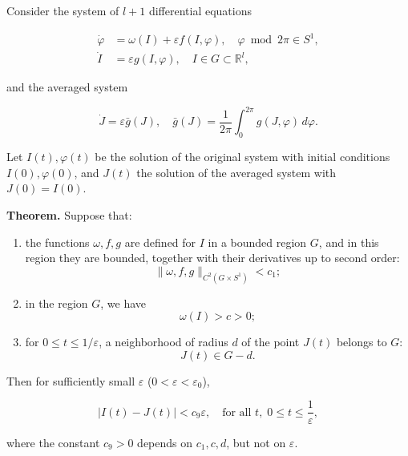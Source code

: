 Consider the system of $l + 1$ differential equations

$$\begin{aligned}
\dot{\varphi} &= \omega(I) + \varepsilon f(I, \varphi), \quad \varphi \bmod 2\pi \in S^1, \\
\dot{I} &= \varepsilon g(I, \varphi), \quad I \in G \subset \mathbb{R}^l,
\end{aligned}$$

and the averaged system

$$\dot{J} = \varepsilon \bar{g}(J), \quad \bar{g}(J) = \frac{1}{2\pi} \int_0^{2\pi} g(J, \varphi) \, d\varphi.$$

Let $I(t), \varphi(t)$ be the solution of the original system with initial conditions $I(0), \varphi(0)$, and $J(t)$ the solution of the averaged system with $J(0) = I(0)$.

\textbf{Theorem.} Suppose that:

\begin{enumerate}
\item the functions $\omega, f, g$ are defined for $I$ in a bounded region $G$, and in this region they are bounded, together with their derivatives up to second order:
$$\|\omega, f, g\|_{C^2(G \times S^1)} < c_1;$$

\item in the region $G$, we have
$$\omega(I) > c > 0;$$

\item for $0 \leq t \leq 1/\varepsilon$, a neighborhood of radius $d$ of the point $J(t)$ belongs to $G$:
$$J(t) \in G - d.$$
\end{enumerate}

Then for sufficiently small $\varepsilon$ ($0 < \varepsilon < \varepsilon_0$),

$$|I(t) - J(t)| < c_9 \varepsilon, \quad \text{for all } t,\; 0 \leq t \leq \frac{1}{\varepsilon},$$

where the constant $c_9 > 0$ depends on $c_1, c, d$, but not on $\varepsilon$.
